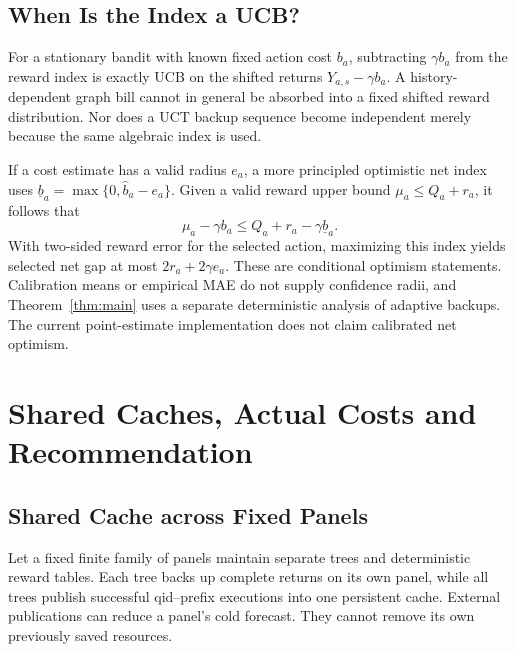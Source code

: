 \subsection{When Is the Index a UCB?}
For a stationary bandit with known fixed action cost $b_a$, subtracting $\gamma b_a$ from the reward index is exactly UCB on the shifted returns $Y_{a,s}-\gamma b_a$. A history-dependent graph bill cannot in general be absorbed into a fixed shifted reward distribution. Nor does a UCT backup sequence become independent merely because the same algebraic index is used.

If a cost estimate has a valid radius $e_a$, a more principled optimistic net index uses $\underline b_a=\max\{0,\widehat b_a-e_a\}$. Given a valid reward upper bound $\mu_a\le Q_a+r_a$, it follows that
\begin{equation}
 \mu_a-\gamma b_a\le Q_a+r_a-\gamma\underline b_a.
 \label{eq:optimism}
\end{equation}
With two-sided reward error for the selected action, maximizing this index yields selected net gap at most $2r_a+2\gamma e_a$. These are conditional optimism statements. Calibration means or empirical MAE do not supply confidence radii, and Theorem~\ref{thm:main} uses a separate deterministic analysis of adaptive backups. The current point-estimate implementation does not claim calibrated net optimism.






\section{Shared Caches, Actual Costs and Recommendation}\label{app:shared-cache}
\subsection{Shared Cache across Fixed Panels}
\label{sec:shared-theorem}
Let a fixed finite family of panels maintain separate trees and deterministic
reward tables. Each tree backs up complete returns on its own panel, while
all trees publish successful qid--prefix executions into one persistent cache.
External publications can reduce a panel's cold forecast. They cannot remove
its own previously saved resources.

